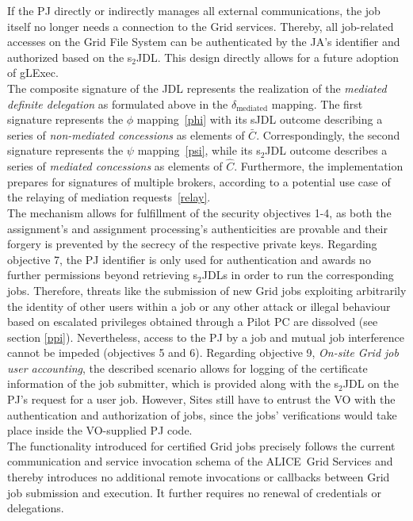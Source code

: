 \documentclass[10pt]{iopart}
\newcommand{\alice}{ALICE}
\begin{document}
If the PJ directly or indirectly manages all external communications,
the job itself no longer needs a
connection to the Grid services. Thereby, all job-related accesses on
the Grid File System can be authenticated by the JA's identifier and authorized
based on the s$_2$JDL.
This design directly allows for a future adoption of gLExec.\\
The composite signature of the JDL represents the realization of the
\textit{mediated definite delegation} as formulated above in the
$\delta_{\text{mediated}}$ mapping. The first signature represents the $\phi$
mapping~\eqref{phi} with its sJDL outcome describing a series of
\textit{non-mediated concessions} as
elements of $\bar{C}$. Correspondingly, the second signature represents the $\psi$
mapping~\eqref{psi}, while its s$_2$JDL outcome
describes a series of \textit{mediated concessions} as elements of $\hat{C}$.
Furthermore, the implementation prepares for signatures of multiple brokers, 
according to a potential use case of the relaying of mediation requests~\eqref{relay}.\\
The mechanism allows for fulfillment of the security objectives 1-4, as
both the assignment's and assignment processing's
authenticities are provable and their forgery is prevented by the secrecy of the 
respective private keys. Regarding objective 7, the PJ identifier is only used
for authentication and awards no further permissions beyond
retrieving s$_2$JDLs in order to run the corresponding jobs. Therefore,
threats like the submission of new Grid jobs exploiting arbitrarily the identity of other users
within a job or any other attack or illegal behaviour
based on escalated privileges obtained through a Pilot PC are dissolved
(see section \ref{ppi}). Nevertheless, access to the PJ by a job and mutual job
interference cannot be impeded (objectives 5 and 6).
Regarding objective 9, \textit{On-site Grid job user accounting}, the
described scenario allows for logging of the certificate information of the
job submitter, which is provided along with the s$_2$JDL on the PJ's
request for a user job. However, Sites still have to
entrust the VO with the authentication and authorization of jobs, since the jobs'
verifications would take place inside the VO-supplied PJ code.\\
The functionality introduced for certified Grid jobs precisely follows
the current communication and service invocation schema of the \alice\ Grid Services
and thereby introduces no
additional remote invocations or callbacks between Grid job submission and
execution. It further requires no renewal of credentials or delegations.
\end{document}
